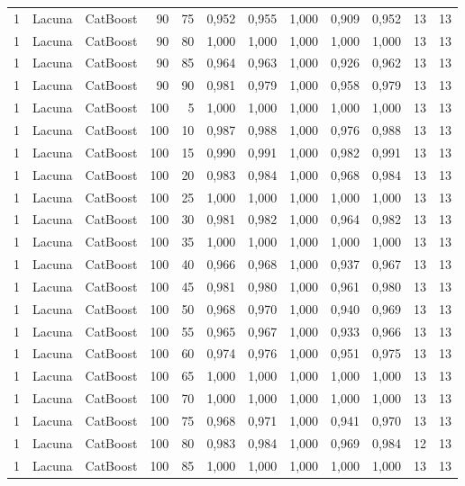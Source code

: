 \begin{longtable}{@{}rllrrrrrrrrr@{}}
1 & Lacuna & CatBoost & 90 & 75 & 0,952 & 0,955 & 1,000 & 0,909 & 0,952 & 13 & 13 \\
1 & Lacuna & CatBoost & 90 & 80 & 1,000 & 1,000 & 1,000 & 1,000 & 1,000 & 13 & 13 \\
1 & Lacuna & CatBoost & 90 & 85 & 0,964 & 0,963 & 1,000 & 0,926 & 0,962 & 13 & 13 \\
1 & Lacuna & CatBoost & 90 & 90 & 0,981 & 0,979 & 1,000 & 0,958 & 0,979 & 13 & 13 \\
1 & Lacuna & CatBoost & 100 & 5 & 1,000 & 1,000 & 1,000 & 1,000 & 1,000 & 13 & 13 \\
1 & Lacuna & CatBoost & 100 & 10 & 0,987 & 0,988 & 1,000 & 0,976 & 0,988 & 13 & 13 \\
1 & Lacuna & CatBoost & 100 & 15 & 0,990 & 0,991 & 1,000 & 0,982 & 0,991 & 13 & 13 \\
1 & Lacuna & CatBoost & 100 & 20 & 0,983 & 0,984 & 1,000 & 0,968 & 0,984 & 13 & 13 \\
1 & Lacuna & CatBoost & 100 & 25 & 1,000 & 1,000 & 1,000 & 1,000 & 1,000 & 13 & 13 \\
1 & Lacuna & CatBoost & 100 & 30 & 0,981 & 0,982 & 1,000 & 0,964 & 0,982 & 13 & 13 \\
1 & Lacuna & CatBoost & 100 & 35 & 1,000 & 1,000 & 1,000 & 1,000 & 1,000 & 13 & 13 \\
1 & Lacuna & CatBoost & 100 & 40 & 0,966 & 0,968 & 1,000 & 0,937 & 0,967 & 13 & 13 \\
1 & Lacuna & CatBoost & 100 & 45 & 0,981 & 0,980 & 1,000 & 0,961 & 0,980 & 13 & 13 \\
1 & Lacuna & CatBoost & 100 & 50 & 0,968 & 0,970 & 1,000 & 0,940 & 0,969 & 13 & 13 \\
1 & Lacuna & CatBoost & 100 & 55 & 0,965 & 0,967 & 1,000 & 0,933 & 0,966 & 13 & 13 \\
1 & Lacuna & CatBoost & 100 & 60 & 0,974 & 0,976 & 1,000 & 0,951 & 0,975 & 13 & 13 \\
1 & Lacuna & CatBoost & 100 & 65 & 1,000 & 1,000 & 1,000 & 1,000 & 1,000 & 13 & 13 \\
1 & Lacuna & CatBoost & 100 & 70 & 1,000 & 1,000 & 1,000 & 1,000 & 1,000 & 13 & 13 \\
1 & Lacuna & CatBoost & 100 & 75 & 0,968 & 0,971 & 1,000 & 0,941 & 0,970 & 13 & 13 \\
1 & Lacuna & CatBoost & 100 & 80 & 0,983 & 0,984 & 1,000 & 0,969 & 0,984 & 12 & 13 \\
1 & Lacuna & CatBoost & 100 & 85 & 1,000 & 1,000 & 1,000 & 1,000 & 1,000 & 13 & 13 \\

\end{longtable}
